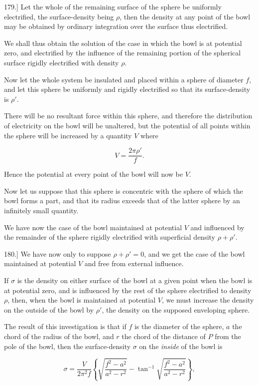 \documentclass[11pt,a4paper]{article}
\begin{document}
179.] Let the whole of the remaining surface of the sphere be uniformly electrified, the surface-density being $\rho$, then the density at any point of the bowl may be obtained by ordinary integration over the surface thus electrified.

We shall thus obtain the solution of the case in which the bowl is at potential zero, and electrified by the influence of the remaining portion of the spherical surface rigidly electrified with density $\rho$.

Now let the whole system be insulated and placed within a sphere of diameter $f$, and let this sphere be uniformly and rigidly electrified so that its surface-density is $\rho'$.

There will be no resultant force within this sphere, and therefore the distribution of electricity on the bowl will be unaltered, but the potential of all points within the sphere will be increased by a quantity $V$ where

\[
V = \frac{2\pi\rho'}{f}.
\]

Hence the potential at every point of the bowl will now be $V$.

Now let us suppose that this sphere is concentric with the sphere of which the bowl forms a part, and that its radius exceeds that of the latter sphere by an infinitely small quantity.

We have now the case of the bowl maintained at potential $V$ and influenced by the remainder of the sphere rigidly electrified with superficial density $\rho+\rho'$.

180.] We have now only to suppose $\rho+\rho'=0$, and we get the case of the bowl maintained at potential $V$ and free from external influence.

If $\sigma$ is the density on either surface of the bowl at a given point when the bowl is at potential zero, and is influenced by the rest of the sphere electrified to density $\rho$, then, when the bowl is maintained at potential $V$, we must increase the density on the outside of the bowl by $\rho'$, the density on the supposed enveloping sphere.

The result of this investigation is that if $f$ is the diameter of the sphere, $a$ the chord of the radius of the bowl, and $r$ the chord of the distance of $P$ from the pole of the bowl, then the surface-density $\sigma$ on the \textit{inside} of the bowl is

\[
\sigma = \frac{V}{2\pi^2f}
\left\{
\sqrt{\frac{f^2-a^2}{a^2-r^2}}
-\tan^{-1}\sqrt{\frac{f^2-a^2}{a^2-r^2}}
\right\},
\]
\end{document}
